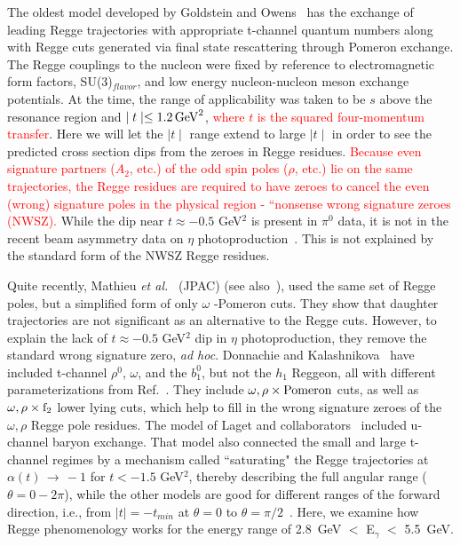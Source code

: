 \documentclass[aps,prc,twocolumn,floatfix,showpacs,preprintnumbers,amsmath,amssymb,superscriptaddress,linenumbers]{revtex4-1}
\begin{document}
The oldest model developed by Goldstein and 
Owens~\cite{Goldstein:1973xn} has the exchange of leading Regge 
trajectories with appropriate t-channel quantum numbers along with 
Regge cuts generated via final state rescattering through Pomeron 
exchange. The Regge couplings to the nucleon were fixed by reference 
to electromagnetic form factors, SU(3)$_{flavor}$, and low energy 
nucleon-nucleon meson exchange potentials. At the time, the range of 
applicability was taken to be $s$ above the resonance region and $\mid 
t \mid \le 1.2 \, {\rm GeV}^2$, \textcolor{red}{where $t$ is the squared 
four-momentum transfer}. Here we will let the $\mid t \mid$ 
range extend to large $\mid t \mid$ in order to see the predicted cross 
section dips from the zeroes in Regge residues. \textcolor{red}{Because even signature partners ($A_2$, etc.) of the odd spin poles ($\rho$, etc.) lie on the same trajectories, the Regge residues are required to have zeroes to cancel the even (wrong) signature poles in the physical region - “nonsense wrong signature zeroes (NWSZ).} While the dip near 
$t\approx -0.5$ GeV$^2$ is present in $\pi^0$ data, it is not in the 
recent beam asymmetry data on $\eta$ 
photoproduction~\cite{AlGhoul:2017nbp}. This is not explained by the 
standard form of the NWSZ Regge residues. 
  
Quite recently, Mathieu {\it et al.}~\cite{Mathieu:2015eia} (JPAC) 
(see also~\cite{Kashevarov:2017vyl}), used the same set of Regge poles, 
but a simplified form of only $\omega$ -Pomeron cuts. They show that 
daughter trajectories are not significant as an alternative to the 
Regge cuts. However, to explain the lack of $t\approx -0.5$ GeV$^2$ 
dip in $\eta$ photoproduction, they remove the standard wrong signature 
zero, {\it ad hoc}.  Donnachie and Kalashnikova~\cite{Donnachie:2015jaa} 
have included t-channel $\rho^0$, $\omega$, and the $b^0_1$, but not 
the $h_1$ Reggeon, all with different parameterizations from 
Ref.~\cite{Goldstein:1973xn}. They include $\omega, \rho \times {\rm 
Pomeron}$ cuts, as well as $\omega, \rho \times {\rm f}_2$ lower lying 
cuts, which help to fill in the wrong signature zeroes of the $\omega, 
\rho$ Regge pole residues. The model of Laget and 
collaborators~\cite{Laget:2005be} included u-channel baryon exchange. 
That model also connected the small and large t-channel regimes by a 
mechanism called ``saturating" the Regge trajectories at $\alpha(t) \, 
\rightarrow \, -1$ for $t < -1.5$ GeV$^2$, thereby describing the full 
angular range ($\theta = 0 - 2\pi$), while the other models are good 
for different ranges of the forward direction, i.e., from $|t| = 
-t_{min}$ at $\theta=0$ to $\theta=\pi/2$~\cite{Goldstein:1973xn,Mathieu:2015eia,
Donnachie:2015jaa}. Here, we examine how Regge phenomenology works for 
the energy range of 2.8~GeV $< $ E$_\gamma$ $<$ 5.5~GeV.
\end{document}
